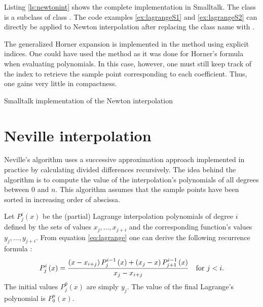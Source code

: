 Listing \ref{ls:newtonint} shows the complete implementation in
Smalltalk. The class  is a subclass of
class . The code examples
\ref{ex:lagrangeS1} and \ref{ex:lagrangeS2} can directly be
applied to Newton interpolation after replacing the class name  with .

The generalized Horner expansion is implemented in the method  using explicit indices. One could have used the method  as it was done for Horner's formula when
evaluating polynomials. In this case, however, one must still keep
track of the index to retrieve the sample point corresponding to
each coefficient. Thus, one gains very little in compactness.

\begin{listing}
  Smalltalk implementation of the Newton interpolation
\label{ls:newtonint}

\end{listing}


\section{Neville interpolation}
\label{sec:neville} Neville's algorithm uses a successive
approximation approach implemented in practice by calculating
divided differences recursively. The idea behind the algorithm is
to compute the value of the interpolation's polynomials of all
degrees between 0 and $n$. This algorithm assumes that the sample
points have been sorted in increasing order of abscissa.

Let $P^i_j\left(x\right)$ be the (partial) Lagrange interpolation
polynomials of degree $i$ defined by the sets of values
$x_j,\ldots,x_{j+i}$ and the corresponding function's values
$y_j,\ldots,y_{j+i}$. From equation \ref{eq:lagrange} one can
derive the following recurrence formula \cite{Press}:
\begin{equation}
\label{eq:neville}
P^i_j\left(x\right)={\left(x-x_{i+j}\right)P^{i-1}_j\left(x\right)
+\left(x_j-x\right)P^{i-1}_{j+1}\left(x\right)\over x_j-x_{i+j}}
\mbox{\quad for $j<i$}.
\end{equation}
The initial values $P^0_j\left(x\right)$ are simply $y_j$. The
value of the final Lagrange's polynomial is $P^n_0\left(x\right)$.

